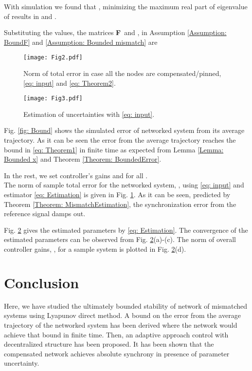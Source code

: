\documentclass[conference]{IEEEtran}
\def\bGamma{\mbox{}}
\def\bF{\mbox{{\bf F}}}
\begin{document}
	With simulation we found that , minimizing the maximum real part of eigenvalue of  results in  and . 	
	
	Substituting the values, the matrices \bF~and \bGamma, in Assumption \ref{Assumption: BoundF} and \ref{Assumption: Bounded mismatch} are 
	
	
	

	
		
	\begin{figure}[t]
	\texttt{[image: Fig2.pdf]}
	\caption{Norm of total error in case all the nodes are compensated/pinned, \eqref{eq: input} and \eqref{eq: Theorem2}.}\label{fig: Error_MismatchCompensated}
	\end{figure}
	
	\begin{figure}[t]
	\texttt{[image: Fig3.pdf]}
	\caption{Estimation of uncertainties with \eqref{eq: input}.}\label{fig: MismatchEstimation}
	\end{figure}



	
		
	Fig. \ref{fig: Bound} shows the simulated error of networked system from its average trajectory. As it can be seen the error from the average trajectory reaches the bound in \eqref{eq: Theorem1} in finite time as expected from Lemma \ref{Lemma: Bounded x} and Theorem \ref{Theorem: BoundedError}. 
	
	
	
	
	 In the rest, we set controller's gains  and  for all .\\
	The norm of sample total error for the networked system, , using \eqref{eq: input} and estimator \eqref{eq: Estimation} is given in Fig. \ref{fig: Error_MismatchCompensated}. As it can be seen, predicted by Theorem \ref{Theorem: MismatchEstimation}, the synchronization error from the reference signal damps out.
	
	Fig. \ref{fig: MismatchEstimation} gives the estimated parameters by \eqref{eq: Estimation}. The convergence of the estimated parameters can be observed from Fig. \ref{fig: MismatchEstimation}(a)-(c). The norm of overall controller gains, , for a sample system is plotted in Fig. \ref{fig: MismatchEstimation}(d). 

\section{Conclusion}
	Here, we have studied the ultimately bounded stability of network of mismatched systems using Lyapunov direct method. A bound on the error from the average trajectory of the networked system has been derived where the network would achieve that bound in finite time. Then, an adaptive approach control with decentralized structure has been proposed. It has been shown that the compensated network achieves absolute synchrony in presence of parameter uncertainty.
\end{document}
